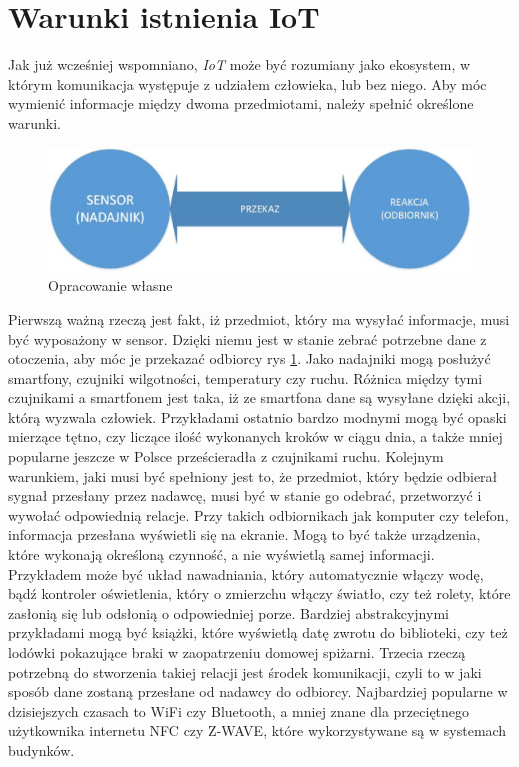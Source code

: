 \documentclass[brudnopis]{xmgr}
\begin{document}
\section{Warunki istnienia IoT}

Jak już wcześniej wspomniano, \emph{IoT} może być rozumiany jako ekosystem, w którym komunikacja występuje z udziałem człowieka, lub bez niego. Aby móc wymienić informacje między dwoma przedmiotami, należy spełnić określone warunki.
\begin{figure}[h]
\centering
\includegraphics[width=\textwidth]{o}
\caption{Opracowanie własne}
\label{fig:opracowanie}
\end{figure} 
Pierwszą ważną rzeczą jest fakt, iż przedmiot, który ma wysyłać informacje, musi być wyposażony w sensor. Dzięki niemu jest w stanie zebrać potrzebne dane z otoczenia, aby móc je przekazać odbiorcy rys \ref{fig:opracowanie}. Jako nadajniki mogą posłużyć smartfony, czujniki wilgotności, temperatury czy ruchu. Różnica między tymi czujnikami a smartfonem jest taka, iż ze smartfona dane są wysyłane dzięki akcji, którą wyzwala człowiek. Przykładami ostatnio bardzo modnymi mogą być opaski mierzące tętno, czy liczące ilość wykonanych kroków w ciągu dnia, a także mniej popularne jeszcze w Polsce prześcieradła z czujnikami ruchu.
Kolejnym warunkiem, jaki musi być spełniony jest to, że przedmiot, który będzie odbierał sygnał przesłany przez nadawcę, musi być w stanie go odebrać, przetworzyć i wywołać odpowiednią relacje. Przy takich odbiornikach jak komputer czy telefon, informacja przesłana wyświetli się na ekranie. Mogą to być także urządzenia, które wykonają określoną czynność, a nie wyświetlą samej informacji. Przykładem może być układ nawadniania, który automatycznie włączy wodę, bądź kontroler oświetlenia, który o zmierzchu włączy światło, czy też rolety, które zasłonią się lub odsłonią o odpowiedniej porze. Bardziej abstrakcyjnymi przykładami mogą być książki, które wyświetlą datę zwrotu do biblioteki, czy też lodówki pokazujące braki w zaopatrzeniu domowej spiżarni.  
Trzecia rzeczą potrzebną do stworzenia takiej relacji jest środek komunikacji, czyli to w jaki sposób dane zostaną przesłane od nadawcy do odbiorcy. Najbardziej popularne w dzisiejszych czasach to WiFi czy Bluetooth, a mniej znane dla przeciętnego użytkownika internetu NFC czy Z-WAVE, które wykorzystywane są w systemach budynków. 
\end{document}
